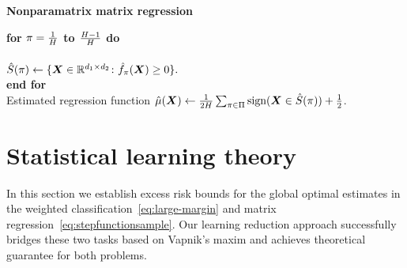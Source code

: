 \documentclass[11pt]{article}
\theoremstyle{plain}
\theoremstyle{definition}
\def\sign{\textup{sign}}
\begin{document}
 \begin{algorithm}[ht]
     \caption{{\bf Nonparamatrix matrix regression} } \label{alg:regest}
{\bf for $\pi={1\over H}$ to ${H-1\over H}$ do}\\
\\[.1cm]
\hspace*{.9cm} $\hat S(\pi) \leftarrow \{\bm X\in\mathbb{R}^{d_1\times d_2}\colon \hat f_\pi(\bm X)\geq 0\}.$
\\[.1cm]
{\bf end for}\\
{Estimated regression function $\hat \mu(\mX) \leftarrow {1\over 2H}\sum_{\pi \in \Pi} \sign (\mX\in \hat S(\pi))+{1\over 2}$.}\\[.1cm]
\end{algorithm}



\section{Statistical learning theory}\label{sec:theory}
In this section we establish excess risk bounds for the global optimal estimates in the weighted classification~\eqref{eq:large-margin} and matrix regression~\eqref{eq:stepfunctionsample}. Our learning reduction approach successfully bridges these two tasks based on Vapnik’s maxim and achieves theoretical guarantee for both problems. 
\end{document}
